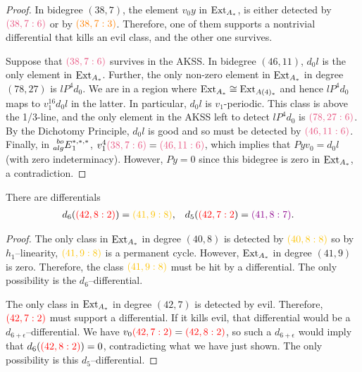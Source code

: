 \begin{proof}
In bidegree $(38,7)$, the element $v_0y$ in $\Ex$, is either detected by $\gdr{38}{7}{6}{lavenderrose}$ or by $\gdr{38}{7}{3}{orange}$. Therefore, one of them supports a nontrivial differential that kills an evil class, and the other one survives.



Suppose that $\gdr{38}{7}{6}{lavenderrose}$ survives in the AKSS. In bidegree $(46,11)$, $d_0l$ is the only element in $\Ex$. Further, the only non-zero element in $\Ex$ in degree $(78,27)$ is $lP^4d_0$. We are in a region where $\Ex \cong \Ext_{A(4)_*}$ and hence $lP^4d_0$ maps to $v_1^{16} d_0l$ in the latter. In particular, $d_0l$ is $v_1$-periodic. This class is above the 1/3-line, and the only element in the AKSS left to detect $lP^4d_0$ is $\gdr{78}{27}{6}{lavenderrose}$. By the Dichotomy Principle, $d_0l$ is good and so must be detected by $\gdr{46}{11}{6}{lavenderrose}$. Finally, in $\E{bo}{alg}^{*,*,*}_{1}$, $v_1^4 \gdr{38}{7}{6}{lavenderrose} = \gdr{46}{11}{6}{lavenderrose}$, which implies that $Pyv_0 = d_0l$ (with zero indeterminacy). However, $Py = 0$ since this bidegree is zero in $\Ex$, a contradiction.
\end{proof}


\begin{prop}\label{prop:exception}
There are differentials
\begin{align*}
d_6( {\color{red}(42,8:2)}) &= {\color{goldenpoppy}(41,9:8)}, & d_5( {\color{red}(42,7:2}) &= {\color{darkmagenta}(41,8:7)} .
\end{align*}
\end{prop}
\begin{proof}
The only class in $\Ex$ in degree $(40,8)$ is detected by ${\color{goldenpoppy}(40,8:8)}$ so by $h_1$--linearity, ${\color{goldenpoppy}(41,9:8)}$ is a permanent cycle. However, $\Ex$ in degree $(41,9)$ is zero. Therefore, the class ${\color{goldenpoppy}(41,9:8)}$ must be hit by a differential. The only possibility is the $d_6$--differential. 

The only class in $\Ex$ in degree $(42,7)$ is detected by evil. Therefore, $\gdr{42}{7}{2}{red}$ must support a differential. If it kills evil, that differential would be a $d_{6+\epsilon}$--differential. We have $v_0\gdr{42}{7}{2}{red} = \gdr{42}{8}{2}{red} $, so such a $d_{6+\epsilon}$ would imply that $d_{6}(\gdr{42}{8}{2}{red} )=0$, contradicting what we have just shown.
The only possibility is this $d_5$--differential.
\end{proof}





